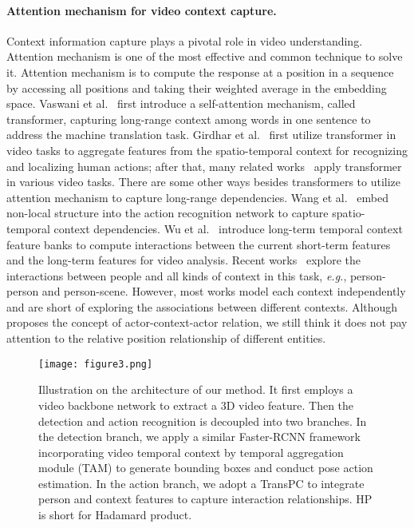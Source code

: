 \documentclass[final]{cvpr}
\begin{document}
\paragraph{Attention mechanism for video context capture.}
Context information capture plays a pivotal role in video understanding. Attention mechanism is one of the most effective and common technique to solve it. Attention mechanism is to compute the response at a position in a sequence by accessing all positions and taking their weighted average in the embedding space. Vaswani et al.~\cite{vaswani2017attention}
first introduce a self-attention mechanism, called transformer, capturing long-range context among words in one sentence to address the machine translation task. Girdhar et al.~\cite{Girdhar_2019_CVPR} first utilize transformer in video tasks to aggregate features from the spatio-temporal context for recognizing and localizing human actions; after that, many related works~\cite{zhou2018end,seong2019video,wang2021transformer} apply transformer in various video tasks.
There are some other ways besides transformers to utilize attention mechanism to capture long-range dependencies.
Wang et al.~\cite{Wang_2018_CVPR} embed non-local structure into the action recognition network to capture spatio-temporal context dependencies.
Wu et al.~\cite{Wu_2019_CVPR} introduce long-term temporal context feature banks to compute interactions between the current short-term features and the long-term features for video analysis. Recent works~\cite{DBLP:conf/eccv/WuKWZW20,DBLP:conf/eccv/TangXMPL20,DBLP:conf/cvpr/PanCSLS021} explore the interactions between people and all kinds of context in this task, \emph{e.g.}, person-person and person-scene. However, most works model each context independently and are short of exploring the associations between different contexts. Although ~\cite{DBLP:conf/cvpr/PanCSLS021} proposes the concept of actor-context-actor relation, we still think it does not pay attention to the relative position relationship of different entities.

\begin{figure*}[t]
\texttt{[image: figure3.png]}
\centering
\caption{Illustration on the architecture of our method. It first employs a video backbone network to extract a 3D video feature. Then the detection and action recognition is decoupled into two branches. In the detection branch, we apply a similar Faster-RCNN framework incorporating video temporal context by temporal aggregation module (TAM) to generate bounding boxes and conduct pose action estimation. In the action branch, we adopt a TransPC to integrate person and context features to capture interaction relationships. HP is short for Hadamard product.}
\vspace{-3mm}
\label{figure3}
\end{figure*}
\end{document}

